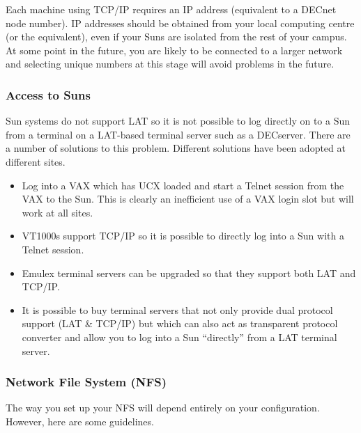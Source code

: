 Each machine using TCP/IP requires an IP address (equivalent to a DECnet node
number). IP addresses should be obtained from your local computing centre
(or the equivalent), even if your Suns are isolated from the rest of your
campus. At some point in the future, you are likely to be connected to
a larger network and
selecting unique numbers at this stage will avoid problems in the future.


\subsubsection{Access to Suns}

Sun systems do not support LAT so it is not possible to log directly on to
a Sun from a terminal on a LAT-based terminal server such as a DECserver.
There are a number of solutions to this problem. Different solutions
have been adopted at different sites.

\begin{itemize}

\item Log into a VAX which has UCX loaded and start a Telnet session
from the VAX to the Sun. This is clearly an inefficient use of a VAX
login slot but
will work at all sites.

\item VT1000s support TCP/IP so it is possible to directly log into a Sun
with a Telnet session.

\item Emulex terminal servers can be upgraded so that they support both LAT
and TCP/IP.

\item It is possible to buy terminal servers that not only provide dual
protocol support (LAT \& TCP/IP) but which can also act as transparent
protocol converter and allow you to log into a Sun ``directly'' from
a LAT terminal server.

\end{itemize}

\subsubsection{Network File System (NFS)}

The way you set up your NFS will depend entirely on your configuration.
However, here are some guidelines.

